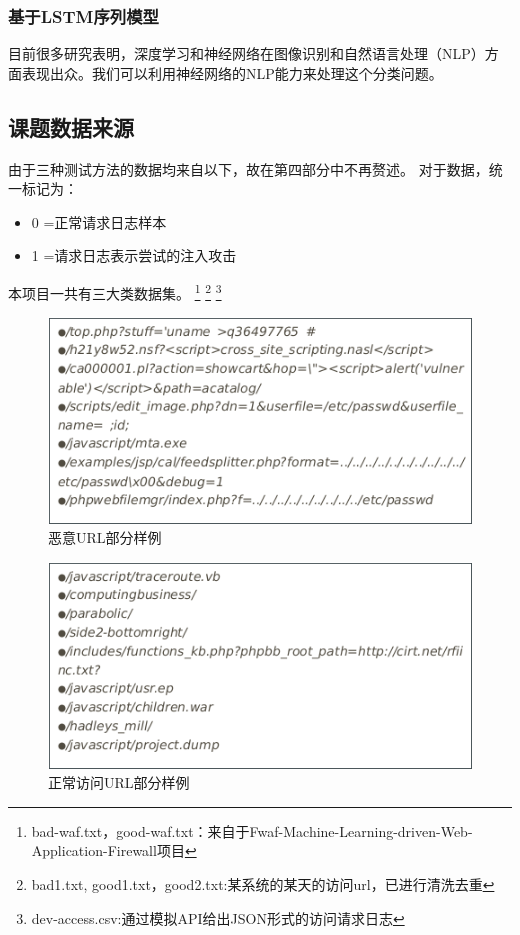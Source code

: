 \subsubsection{基于LSTM序列模型}
目前很多研究表明，深度学习和神经网络在图像识别和自然语言处理（NLP）方面表现出众。我们可以利用神经网络的NLP能力来处理这个分类问题。
\subsection{课题数据来源}
由于三种测试方法的数据均来自以下，故在第四部分中不再赘述。
对于数据，统一标记为：
\begin{itemize}
    \item 0 =正常请求日志样本
    \item 1 =请求日志表示尝试的注入攻击
\end{itemize}
本项目一共有三大类数据集。\setcounter{footnote}{0}
\footnote{bad-waf.txt，good-waf.txt：来自于Fwaf-Machine-Learning-driven-Web-Application-Firewall项目}
\footnote{bad1.txt, good1.txt，good2.txt:某系统的某天的访问url，已进行清洗去重}
\footnote{dev-access.csv:通过模拟API给出JSON形式的访问请求日志}
\begin{figure}[!h]
    \setlength{\abovecaptionskip}{0.cm}
    \setlength{\belowcaptionskip}{-0.cm}
    \centering
     \includegraphics[scale=0.4]{Figs/bad.png}
    \caption{恶意URL部分样例}
    \label{fig:bad_sample}
\end{figure}
\begin{figure}[!h]
    \setlength{\abovecaptionskip}{0.cm}
    \setlength{\belowcaptionskip}{-0.cm}
    \centering
     \includegraphics[scale=0.4]{Figs/good.png}
    \caption{正常访问URL部分样例}
    \label{fig:good_sample}
\end{figure}
